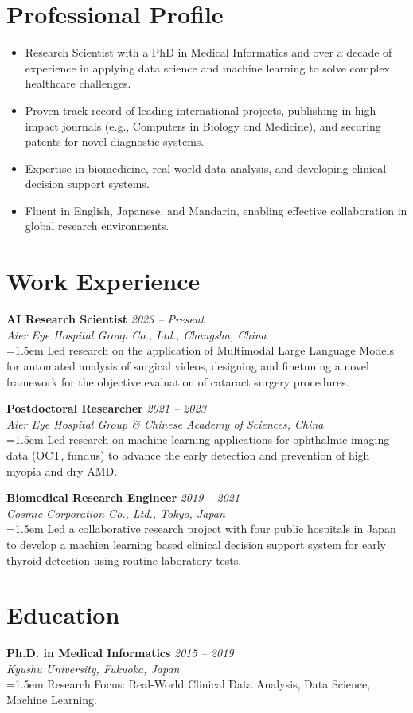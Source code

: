 \documentclass[11pt, a4paper]{scrartcl}
\newcommand{\workentry}[4]{%
    \noindent\textbf{#2} \hfill \textit{\color{gray} #1} \\
    \textit{#3} \\
    \vspace{0.5ex}
    \noindent\hangindent=1.5em\hangafter=0 \small #4 \normalsize\par
    \vspace{1.5ex}
}
\newcommand{\educationentry}[4]{%
    \noindent\textbf{#2} \hfill \textit{\color{gray} #1} \\
    \textit{#3} \\
    \vspace{0.5ex}
    \noindent\hangindent=1.5em\hangafter=0 \small #4 \normalsize\par
    \vspace{1.5ex}
}
\begin{document}
\section*{Professional Profile}
\begin{itemize}[leftmargin=1.5em, itemsep=0.5ex]
    \item Research Scientist with a PhD in Medical Informatics and over a decade of experience in applying data science and machine learning to solve complex healthcare challenges.
    \item Proven track record of leading international projects, publishing in high-impact journals (e.g., Computers in Biology and Medicine), and securing patents for novel diagnostic systems.
    \item Expertise in biomedicine, real-world data analysis, and developing clinical decision support systems.
    \item Fluent in English, Japanese, and Mandarin, enabling effective collaboration in global research environments.
\end{itemize}

\section*{Work Experience}
\workentry{2023 -- Present}
    {AI Research Scientist}
    {Aier Eye Hospital Group Co., Ltd., Changsha, China}
    {Led research on the application of Multimodal Large Language Models for automated analysis of surgical videos, designing and finetuning a novel framework for the objective evaluation of cataract surgery procedures.
}

\workentry{2021 -- 2023}
    {Postdoctoral Researcher}
    {Aier Eye Hospital Group \& Chinese Academy of Sciences, China}
    {Led research on machine learning applications for ophthalmic imaging data (OCT, fundus) to advance the early detection and prevention of high myopia and dry AMD. }

\workentry{2019 -- 2021}
    {Biomedical Research Engineer}
    {Cosmic Corporation Co., Ltd., Tokyo, Japan}
    {Led a collaborative research project with four public hospitals in Japan to develop a machien learning based clinical decision support system for early thyroid detection using routine laboratory tests. }

\section*{Education}
\educationentry{2015 -- 2019}
    {Ph.D. in Medical Informatics}
    {Kyushu University, Fukuoka, Japan }
    {Research Focus: Real-World Clinical Data Analysis, Data Science, Machine Learning.}
\end{document}
